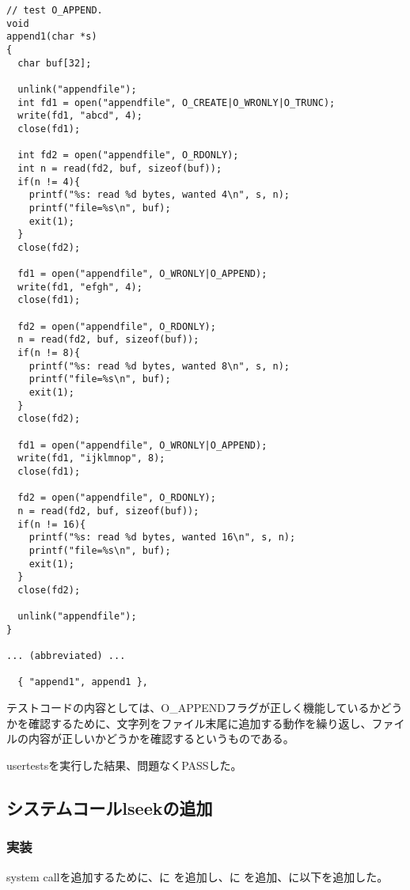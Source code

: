 \documentclass[platex,dvipdfmx, titlepage]{jlreq} %
\begin{document}
\begin{lstlisting}[caption={user/usertests.c}]
// test O_APPEND.
void
append1(char *s)
{
  char buf[32];

  unlink("appendfile");
  int fd1 = open("appendfile", O_CREATE|O_WRONLY|O_TRUNC);
  write(fd1, "abcd", 4);
  close(fd1);

  int fd2 = open("appendfile", O_RDONLY);
  int n = read(fd2, buf, sizeof(buf));
  if(n != 4){
    printf("%s: read %d bytes, wanted 4\n", s, n);
    printf("file=%s\n", buf);
    exit(1);
  }
  close(fd2);

  fd1 = open("appendfile", O_WRONLY|O_APPEND);
  write(fd1, "efgh", 4);
  close(fd1);

  fd2 = open("appendfile", O_RDONLY);
  n = read(fd2, buf, sizeof(buf));
  if(n != 8){
    printf("%s: read %d bytes, wanted 8\n", s, n);
    printf("file=%s\n", buf);
    exit(1);
  }
  close(fd2);

  fd1 = open("appendfile", O_WRONLY|O_APPEND);
  write(fd1, "ijklmnop", 8);
  close(fd1);

  fd2 = open("appendfile", O_RDONLY);
  n = read(fd2, buf, sizeof(buf));
  if(n != 16){
    printf("%s: read %d bytes, wanted 16\n", s, n);
    printf("file=%s\n", buf);
    exit(1);
  }
  close(fd2);

  unlink("appendfile");
}

... (abbreviated) ...

  { "append1", append1 },
\end{lstlisting}

テストコードの内容としては、O\_APPENDフラグが正しく機能しているかどうかを確認するために、文字列をファイル末尾に追加する動作を繰り返し、ファイルの内容が正しいかどうかを確認するというものである。

usertestsを実行した結果、問題なくPASSした。

\subsection{システムコールlseekの追加}

\subsubsection*{実装}

system callを追加するために、に を追加し、に を追加、に以下を追加した。
\end{document}
